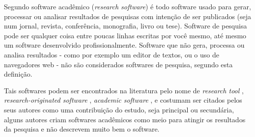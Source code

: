%
%

Segundo  software acadêmico ({\it research
software}) é todo software usado para gerar, processar ou analisar resultados
de pesquisas com intenção de ser publicados (seja num jornal, revista,
conferência, monografia, livro ou tese). Software de pesquisa pode ser qualquer
coisa entre poucas linhas escritas por você mesmo, até mesmo um software
desenvolvido profissionalmente. Software que não gera, processa ou analisa
resultados - como por exemplo um editor de textos, ou o uso de navegadores web
- não são considerados softwares de pesquisa, segundo esta definição.


Tais softwares podem ser encontrados na literatura pelo nome de {\it research
tool} \cite{Portillo12}, {\it research-originated software} \cite{Kon2011},
{\it academic software} \cite{allen2017engineering}, e costumam ser citados
pelos seus autores como uma contribuição do estudo, seja principal ou
secundária, alguns autores criam softwares acadêmicos como meio para atingir os
resultados da pesquisa e não descrevem muito bem o software.

%
%

%
%
%
%

